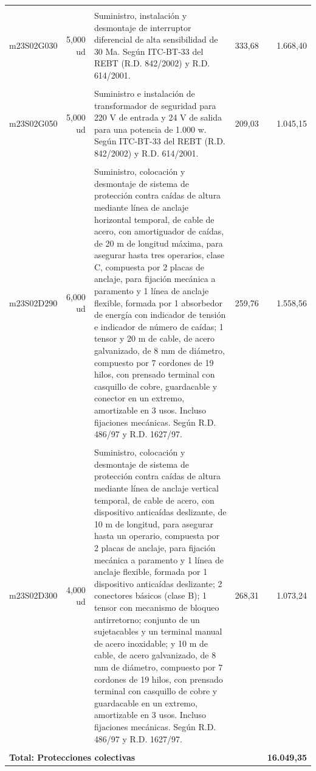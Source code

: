 \documentclass{book}%
\begin{document}
\begin{longtable}{lrlrr}
&&&&\\%
m23S02G030&     5,000 ud&\multicolumn{1}{p{5cm}}{Suministro, instalación y desmontaje de interruptor diferencial de alta sensibilidad de 30 Ma. Según ITC{-}BT{-}33 del REBT (R.D. 842/2002) y R.D. 614/2001.}&    333,68&1.668,40\\%
&&&&\\%
m23S02G050&     5,000 ud&\multicolumn{1}{p{5cm}}{Suministro e instalación de transformador de seguridad para 220 V de entrada y 24 V de salida para una potencia de 1.000 w. Según ITC{-}BT{-}33 del REBT (R.D. 842/2002) y R.D. 614/2001.}&    209,03&1.045,15\\%
&&&&\\%
m23S02D290&     6,000 ud&\multicolumn{1}{p{5cm}}{Suministro, colocación y desmontaje de sistema de protección contra caídas de altura mediante línea de anclaje horizontal temporal, de cable de acero, con amortiguador de caídas, de 20 m de longitud máxima, para asegurar hasta tres operarios, clase C, compuesta por 2 placas de anclaje, para fijación mecánica a paramento y 1 línea de anclaje flexible, formada por 1 absorbedor de energía con indicador de tensión e indicador de número de caídas; 1 tensor y 20 m de cable, de acero galvanizado, de 8 mm de diámetro, compuesto por 7 cordones de 19 hilos, con prensado terminal con casquillo de cobre, guardacable y conector en un extremo, amortizable en 3 usos. Incluso fijaciones mecánicas. Según R.D. 486/97 y R.D. 1627/97.}&    259,76&1.558,56\\%
&&&&\\%
m23S02D300&     4,000 ud&\multicolumn{1}{p{5cm}}{Suministro, colocación y desmontaje de sistema de protección contra caídas de altura mediante línea de anclaje vertical temporal, de cable de acero, con dispositivo anticaídas deslizante, de 10 m de longitud, para asegurar hasta un operario, compuesta por 2 placas de anclaje, para fijación mecánica a paramento y 1 línea de anclaje flexible, formada por 1 dispositivo anticaídas deslizante; 2 conectores básicos (clase B); 1 tensor con mecanismo de bloqueo antirretorno; conjunto de un sujetacables y un terminal manual de acero inoxidable; y 10 m de cable, de acero galvanizado, de 8 mm de diámetro, compuesto por 7 cordones de 19 hilos, con prensado terminal con casquillo de cobre y guardacable en un extremo, amortizable en 3 usos. Incluso fijaciones mecánicas. Según R.D. 486/97 y R.D. 1627/97.}&    268,31&1.073,24\\%
&&&&\\%
\multicolumn{4}{p{8cm}}{\textbf{Total: Protecciones colectivas}}&\textbf{16.049,35}\\%
\end{longtable}%
\normalsize
\end{document}
